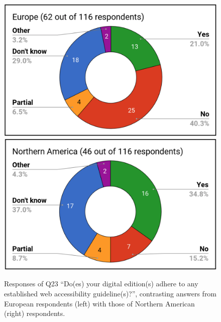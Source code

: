 \begin{paper}
\renewcommand*{\thefootnote}{\fnsymbol{footnote}}
\begin{figure}[p!]
\includegraphics[width=\textwidth]{media/martinez3a.png}\\
\includegraphics[width=\textwidth]{media/martinez3b.png}
\caption[Responses of Q23 ``Do(es) your digital edition(s) adhere to any established web accessibility guideline(s)?'', contrasting answers from European respondents (left) with those of
Northern American (right) respondents.]{Responses of Q23 ``Do(es) your digital edition(s) adhere to any established web accessibility guideline(s)?'', contrasting answers from European respondents (left) with those of
Northern American (right) respondents.}
\label{q23}
\end{figure}
\renewcommand*{\thefootnote}{\arabic{footnote}}


\end{paper}
